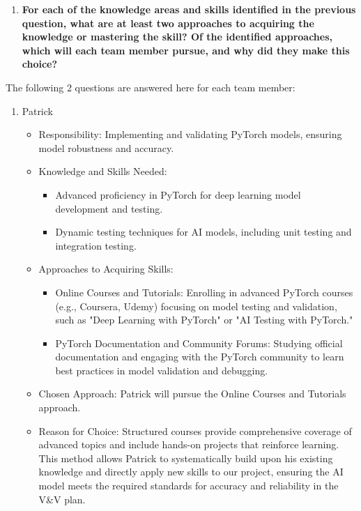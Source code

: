 \documentclass[12pt, titlepage]{article}
\begin{document}
\begin{enumerate}
\begin{enumerate}
  \item \textbf{For each of the knowledge areas and skills identified in the previous
  question, what are at least two approaches to acquiring the knowledge or
  mastering the skill?  Of the identified approaches, which will each team
  member pursue, and why did they make this choice?}
\end{enumerate}
The following 2 questions are answered here for each team member:

\begin{enumerate}
  \item Patrick

  \begin{itemize}
      \item[-]Responsibility: Implementing and validating PyTorch models, ensuring model robustness and accuracy.
      \item[-] Knowledge and Skills Needed:
      \begin{itemize}
          \item[-] Advanced proficiency in PyTorch for deep learning model development and testing.
          \item[-] Dynamic testing techniques for AI models, including unit testing and integration testing.
      \end{itemize}
      \item[-] Approaches to Acquiring Skills:
      \begin{itemize}
          \item Online Courses and Tutorials: Enrolling in advanced PyTorch courses (e.g., Coursera, Udemy) focusing on model testing and validation, such as "Deep Learning with PyTorch" or "AI Testing with PyTorch."
          \item PyTorch Documentation and Community Forums: Studying official documentation and engaging with the PyTorch community to learn best practices in model validation and debugging.
      \end{itemize}
      \item[-] Chosen Approach: Patrick will pursue the Online Courses and Tutorials approach.
      \item[-] Reason for Choice: Structured courses provide comprehensive coverage of advanced topics and include hands-on projects that reinforce learning. This method allows Patrick to systematically build upon his existing knowledge and directly apply new skills to our project, ensuring the AI model meets the required standards for accuracy and reliability in the V\&V plan.
  \end{itemize}


\end{enumerate}
\end{enumerate}
\end{document}
